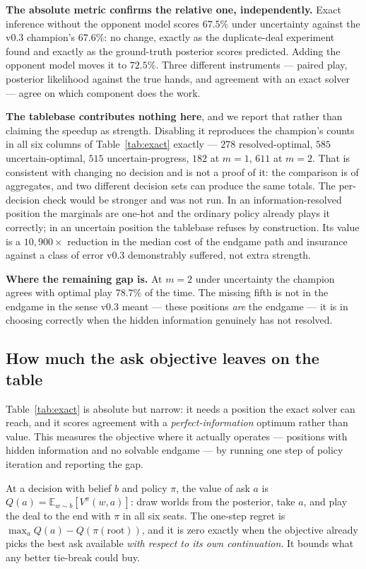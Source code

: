 \documentclass[11pt,a4paper]{article}
\begin{document}
\textbf{The absolute metric confirms the relative one, independently.} Exact
inference without the opponent model scores $67.5\%$ under uncertainty against
the v0.3 champion's $67.6\%$: no change, exactly as the duplicate-deal
experiment found and exactly as the ground-truth posterior scores predicted.
Adding the opponent model moves it to $72.5\%$. Three different instruments ---
paired play, posterior likelihood against the true hands, and agreement with an
exact solver --- agree on which component does the work.

\textbf{The tablebase contributes nothing here}, and we report that rather than
claiming the speedup as strength. Disabling it reproduces the champion's
counts in all six columns of Table~\ref{tab:exact} exactly --- $278$
resolved-optimal, $585$ uncertain-optimal, $515$ uncertain-progress, $182$ at
$m{=}1$, $611$ at $m{=}2$. That is consistent with changing no decision and is
not a proof of it: the comparison is of aggregates, and two different decision
sets can produce the same totals. The per-decision check would be stronger and
was not run. In an information-resolved position the marginals are one-hot and the
ordinary policy already plays it correctly; in an uncertain position the
tablebase refuses by construction. Its value is a $10{,}900\times$ reduction in
the median cost of the endgame path and insurance against a class of error v0.3
demonstrably suffered, not extra strength.

\textbf{Where the remaining gap is.} At $m{=}2$ under uncertainty the champion
agrees with optimal play $78.7\%$ of the time. The missing fifth is not in the
endgame in the sense v0.3 meant --- these positions \emph{are} the endgame --- it
is in choosing correctly when the hidden information genuinely has not resolved.

\subsection{How much the ask objective leaves on the table}
\label{sec:res-regret}

Table~\ref{tab:exact} is absolute but narrow: it needs a position the exact
solver can reach, and it scores agreement with a \emph{perfect-information}
optimum rather than value. This measures the objective where it actually
operates --- positions with hidden information and no solvable endgame --- by
running one step of policy iteration and reporting the gap.

At a decision with belief $b$ and policy $\pi$, the value of ask $a$ is
$Q(a) = \mathbb{E}_{w \sim b}[V^{\pi}(w, a)]$: draw worlds from the posterior,
take $a$, and play the deal to the end with $\pi$ in all six seats. The one-step
regret is $\max_a Q(a) - Q(\pi(\text{root}))$, and it is zero exactly when the
objective already picks the best ask available \emph{with respect to its own
continuation}. It bounds what any better tie-break could buy.
\end{document}
